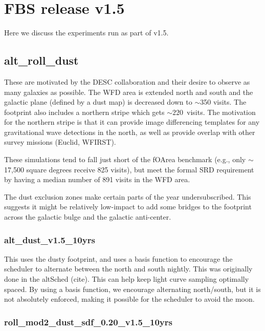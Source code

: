 

\section{FBS release v1.5}

Here we discuss the experiments run as part of v1.5. 



\subsection{alt\_roll\_dust}

These are motivated by the DESC collaboration and their desire to observe as many galaxies as possible. The WFD area is extended north and south and the galactic plane (defined by a dust map) is decreased down to $\sim$350 visits. The footprint also includes a northern stripe which gets $\sim220$\ visits. The motivation for the northern stripe is that it can provide image differencing templates for any gravitational wave detections in the north, as well as provide overlap with other survey missions (Euclid, WFIRST).

These simulations tend to fall just short of the fOArea benchmark (e.g., only $\sim$17,500 square degrees receive 825 visits), but meet the formal SRD requirement by having a median number of 891 visits in the WFD area.  

The dust exclusion zones make certain parts of the year undersubscribed. This suggests it might be relatively low-impact to add some bridges to the footprint across the galactic bulge and the galactic anti-center.  

\subsubsection{alt\_dust\_v1.5\_10yrs}

This uses the dusty footprint, and uses a basis function to encourage the scheduler to alternate between the north and south nightly. This was originally done in the altSched (cite). This can help keep light curve sampling optimally spaced. By using a basis function, we encourage alternating north/south, but it is not absolutely enforced, making it possible for the scheduler to avoid the moon.


\subsubsection{roll\_mod2\_dust\_sdf\_0.20\_v1.5\_10yrs}

